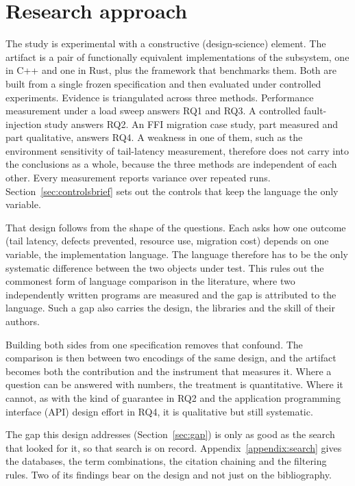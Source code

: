 \documentclass[english,oneside,a4paper,censored,csm,software-track-2020]{HYthesisML}
\begin{document}
\section{Research approach}\label{sec:approach}
The study is experimental with a constructive (design-science) element. The artifact is a pair
of functionally equivalent implementations of the subsystem, one in C++ and one in Rust,
plus the framework that benchmarks them. Both are built from a single frozen specification
and then evaluated under controlled experiments. Evidence is triangulated across three
methods. Performance measurement under a load sweep answers RQ1 and RQ3. A controlled
fault-injection study answers RQ2. An FFI migration case study, part measured and part
qualitative, answers RQ4. A weakness in one of them, such as the environment sensitivity of tail-latency
measurement, therefore does not carry into the conclusions as a whole, because the three methods are independent of each other. Every measurement reports variance over repeated runs.
Section~\ref{sec:controlsbrief} sets out the controls that keep the language the only variable.

That design follows from the shape of the questions. Each asks how one outcome (tail latency,
defects prevented, resource use, migration cost) depends on one variable, the implementation
language. The language therefore has to be the only systematic difference between the two
objects under test. This rules out the commonest form of language comparison in the literature,
where two independently written programs are measured and the gap is attributed to the
language. Such a gap also carries the design, the libraries and the skill of their authors.

Building both sides from one specification removes that confound. The comparison is then between
two encodings of the same design, and the artifact becomes both the contribution and the
instrument that measures it. Where a question can be answered with numbers, the treatment is
quantitative. Where it cannot, as with the kind of guarantee in RQ2 and the application
programming interface (API) design effort in RQ4, it is qualitative but still systematic.

The gap this design addresses (Section~\ref{sec:gap}) is only as good as the search that looked
for it, so that search is on record. Appendix~\ref{appendix:search} gives the databases, the term
combinations, the citation chaining and the filtering rules. Two of its findings bear on the
design and not just on the bibliography.
\end{document}
